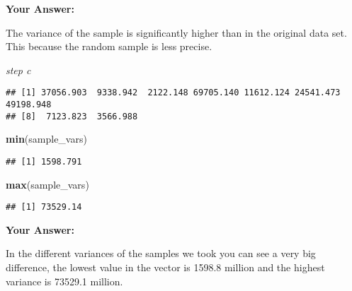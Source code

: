 \documentclass[
]{article}
\newenvironment{Shaded}{\begin{snugshade}}{\end{snugshade}}
\newcommand{\AttributeTok}[1]{\textcolor[rgb]{0.13,0.29,0.53}{#1}}
\newcommand{\ControlFlowTok}[1]{\textcolor[rgb]{0.13,0.29,0.53}{\textbf{#1}}}
\newcommand{\DecValTok}[1]{\textcolor[rgb]{0.00,0.00,0.81}{#1}}
\newcommand{\FunctionTok}[1]{\textcolor[rgb]{0.13,0.29,0.53}{\textbf{#1}}}
\newcommand{\NormalTok}[1]{#1}
\newcommand{\OtherTok}[1]{\textcolor[rgb]{0.56,0.35,0.01}{#1}}
\newcommand{\SpecialCharTok}[1]{\textcolor[rgb]{0.81,0.36,0.00}{\textbf{#1}}}
\begin{document}
\textbf{Your Answer:}

The variance of the sample is significantly higher than in the original
data set. This because the random sample is less precise.

\emph{step c}

\begin{Shaded}
\end{Shaded}

\begin{verbatim}
## [1] 37056.903  9338.942  2122.148 69705.140 11612.124 24541.473 49198.948
## [8]  7123.823  3566.988
\end{verbatim}

\begin{Shaded}
\begin{Highlighting}[]
\FunctionTok{min}\NormalTok{(sample\_vars)}
\end{Highlighting}
\end{Shaded}

\begin{verbatim}
## [1] 1598.791
\end{verbatim}

\begin{Shaded}
\begin{Highlighting}[]
\FunctionTok{max}\NormalTok{(sample\_vars)}
\end{Highlighting}
\end{Shaded}

\begin{verbatim}
## [1] 73529.14
\end{verbatim}

\textbf{Your Answer:}

In the different variances of the samples we took you can see a very big
difference, the lowest value in the vector is 1598.8 million and the
highest variance is 73529.1 million.
\end{document}

